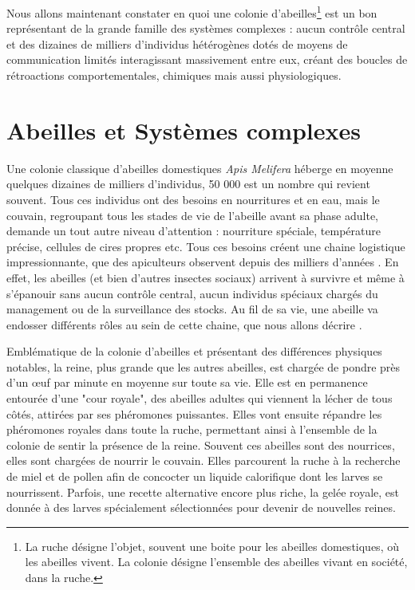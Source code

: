			Nous allons maintenant constater en quoi une colonie d'abeilles\footnote{La ruche désigne l'objet, souvent une boite pour les abeilles domestiques, où les abeilles vivent. La colonie désigne l'ensemble des abeilles vivant en société, dans la ruche.} est un bon représentant de la grande famille des systèmes complexes : aucun contrôle central et des dizaines de milliers d'individus hétérogènes dotés de moyens de communication limités interagissant massivement entre eux, créant des boucles de rétroactions comportementales, chimiques mais aussi physiologiques.
			
			

	
		\section{Abeilles et Systèmes complexes}	
		\label{sectionBio}	
			Une colonie classique d'abeilles domestiques \textit{Apis Melifera} héberge en moyenne quelques dizaines de milliers d'individus, 50 000 est un nombre qui revient souvent. Tous ces individus ont des besoins en nourritures et en eau, mais le couvain, regroupant tous les stades de vie de l'abeille avant sa phase adulte, demande un tout autre niveau d'attention : nourriture spéciale, température précise, cellules de cires propres etc. Tous ces besoins créent une chaine logistique impressionnante, que des apiculteurs observent depuis des milliers d'années \cite{oldroyd_domestication_2012}. En effet, les abeilles (et bien d'autres insectes sociaux) arrivent à survivre et même à s'épanouir sans aucun contrôle central, aucun individus spéciaux chargés du management ou de la surveillance des stocks. Au fil de sa vie, une abeille va endosser différents rôles au sein de cette chaine, que nous allons décrire \cite{winston_biology_1991, winston_role_1991, seeley_age_1991}. 
			
			Emblématique de la colonie d'abeilles et présentant des différences physiques notables, la reine, plus grande que les autres abeilles, est chargée de pondre près d'un œuf par minute en moyenne sur toute sa vie. Elle est en permanence entourée d'une "cour royale", des abeilles adultes qui viennent la lécher de tous côtés, attirées par ses phéromones puissantes. Elles vont ensuite répandre les phéromones royales dans toute la ruche, permettant ainsi à l'ensemble de la colonie de sentir la présence de la reine. Souvent ces abeilles sont des nourrices, elles sont chargées de nourrir le couvain. Elles parcourent la ruche à la recherche de miel et de pollen afin de concocter un liquide calorifique dont les larves se nourrissent. Parfois, une recette alternative encore plus riche, la gelée royale, est donnée à des larves spécialement sélectionnées pour devenir de nouvelles reines.
			
